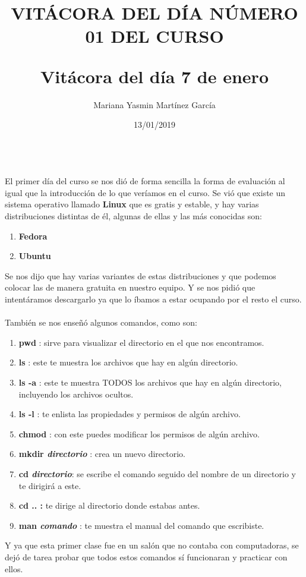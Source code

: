 \documentclass[letterpaper, 12pt, twoside]{article}
\title{\Huge\item\color{red}\textbf {VITÁCORA DEL DÍA NÚMERO 01 DEL CURSO}}
\author{Mariana Yasmin Martínez García}
\date{13/01/2019}
\begin{document}
	\maketitle
	\begin{figure}
		\centering
		\caption{}
		\label{fig:1}
	\end{figure}
	
	
	\newpage
	
	\title{\huge\textbf{Vitácora del día 7 de enero\\}} \\
	El primer día del curso se nos dió de forma sencilla la forma de evaluación al igual que la introducción de lo que veríamos en el curso.
	Se vió que existe un sistema operativo llamado \textbf{Linux} que es gratis y estable, y hay varias distribuciones distintas de él, algunas de ellas y las más conocidas son:
	\begin{enumerate}
		\item\textbf{Fedora}
		\item\textbf{Ubuntu}
	\end{enumerate} 
    Se nos dijo que hay varias variantes de estas distribuciones y que podemos colocar las de manera gratuita en nuestro equipo. Y se nos pidió que intentáramos descargarlo ya que lo íbamos a estar ocupando por el resto el curso.\\ \\
   
También se nos enseñó algunos comandos, como son: 
	\begin{enumerate}
		\item \textbf{\large pwd }: sirve para visualizar el directorio en el que nos encontramos.
		\item \textbf{\large ls }: este te muestra los archivos que hay en algún directorio.
		\item \textbf{\large ls -a }: este te muestra TODOS los archivos que hay en algún directorio, incluyendo los archivos ocultos.
		\item \textbf{\large ls -l }: te enlista las propiedades y permisos de algún archivo.
		\item \textbf{\large chmod }: con este puedes modificar los permisos de algún archivo.
		\item \textbf{\large mkdir \textit{directorio} }: crea un nuevo directorio.
		\item \textbf{\large cd \textit{directorio}}: se escribe el comando seguido del nombre de un directorio y te dirigirá a este.
		\item \textbf{\large cd .. :} te dirige al directorio donde estabas antes.
		\item \textbf{\large man \textit{comando} }: te muestra el manual del comando que escribiste.	
	\end{enumerate}
    Y ya que esta primer clase fue en un salón que no contaba con computadoras, se dejó de tarea probar que todos estos comandos sí funcionaran y practicar con ellos.

	
	
	
\end{document}
